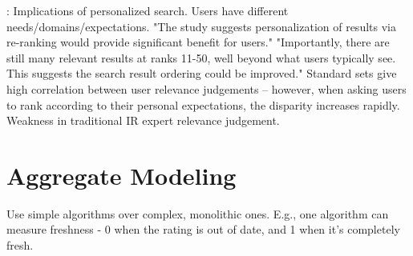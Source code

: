 \cite[p2]{Teevan2005a}: Implications of personalized search. Users have different needs/domains/expectations.
"The study suggests personalization of results via re-ranking would provide significant benefit for users."
"Importantly, there are still many relevant results at ranks 11-50, well beyond what users typically see. 
This suggests the search result ordering could be improved."
Standard sets give high correlation between user relevance judgements -- however, when asking users
to rank according to their personal expectations, the disparity increases rapidly. Weakness in 
traditional IR expert relevance judgement.




\section{Aggregate Modeling}

Use simple algorithms over complex, monolithic ones. E.g., one algorithm can measure freshness - 0 when the rating is out of date, and 1 when it's completely fresh.



